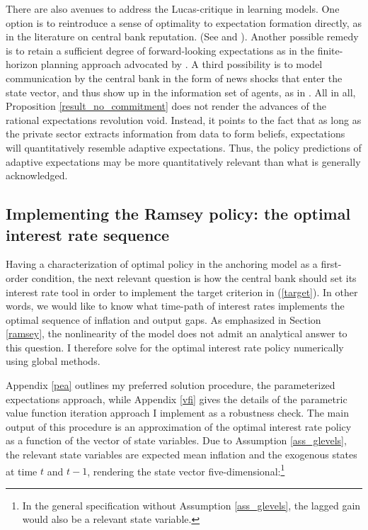 \documentclass[11pt]{article}
\renewcommand{\[}{\begin{equation}}
\renewcommand{\]}{\end{equation}}
\begin{document}
There are also avenues to address the Lucas-critique in learning models. One option is to reintroduce a sense of optimality to expectation formation directly, as in the literature on central bank reputation. (See \cite{cho1995induction} and \cite{ireland2000expectations}). Another possible remedy is to retain a sufficient degree of forward-looking expectations as in the finite-horizon planning approach advocated by \cite{woodford2019monetary}. A third possibility is to model communication by the central bank in the form of news shocks that enter the state vector, and thus show up in the information set of agents, as in \cite{dombeck2017effects}. All in all, Proposition \ref{result_no_commitment} does not render the advances of the rational expectations revolution void. Instead, it points to the fact that as long as the private sector extracts information from data to form beliefs, expectations will quantitatively resemble adaptive expectations. Thus, the policy predictions of adaptive expectations may be more quantitatively relevant than what is generally acknowledged.



\subsection{Implementing the Ramsey policy: the optimal interest rate sequence}\label{implement}
Having a characterization of optimal policy in the anchoring model as a first-order condition, the next relevant question is how the central bank should set its interest rate tool in order to implement the target criterion in (\ref{target}). In other words, we would like to know what time-path of interest rates implements the optimal sequence of inflation and output gaps. As emphasized in Section \ref{ramsey}, the nonlinearity of the model does not admit an analytical answer to this question. I therefore solve for the optimal interest rate policy numerically using global methods. 

Appendix \ref{pea} outlines my preferred solution procedure, the parameterized expectations approach, while Appendix \ref{vfi} gives the details of the parametric value function iteration approach I implement as a robustness check. The main output of this procedure is an approximation of the optimal interest rate policy as a function of the vector of state variables. Due to Assumption \ref{ass_glevels}, the relevant state variables are expected mean inflation and the exogenous states at time $t$ and $t-1$, rendering the state vector five-dimensional:\footnote{In the general specification without Assumption \ref{ass_glevels}, the lagged gain would also be a relevant state variable.}
\end{document}
